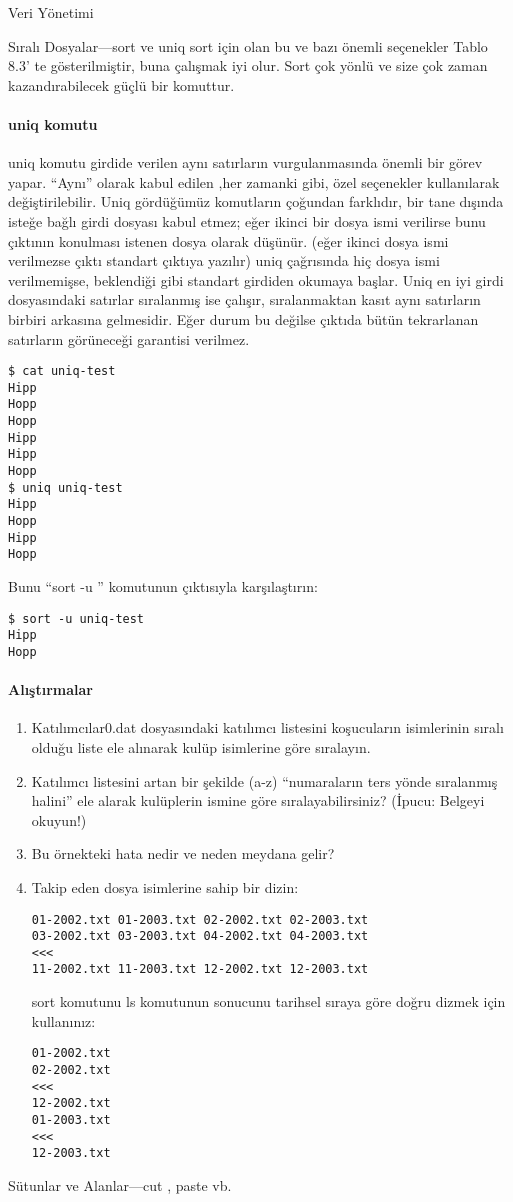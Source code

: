 \begin{section}{Veri Yönetimi}
\begin{subsection}{Sıralı Dosyalar—sort ve uniq}
sort için olan bu ve bazı önemli seçenekler Tablo 8.3' te gösterilmiştir, buna çalışmak iyi olur. Sort çok yönlü ve size çok zaman kazandırabilecek güçlü bir komuttur.
\paragraph{uniq komutu}{uniq komutu girdide verilen aynı satırların vurgulanmasında önemli bir görev yapar.  “Aynı” olarak kabul edilen ,her zamanki gibi, özel seçenekler kullanılarak değiştirilebilir. Uniq gördüğümüz komutların çoğundan farklıdır, bir tane dışında isteğe bağlı girdi dosyası kabul etmez; eğer ikinci bir dosya ismi verilirse bunu çıktının konulması istenen dosya olarak düşünür. (eğer ikinci dosya ismi verilmezse çıktı standart çıktıya yazılır) uniq çağrısında hiç dosya ismi verilmemişse, beklendiği gibi standart girdiden okumaya başlar. Uniq en iyi girdi dosyasındaki satırlar sıralanmış ise çalışır, sıralanmaktan kasıt aynı satırların birbiri arkasına gelmesidir. Eğer durum bu değilse çıktıda bütün tekrarlanan satırların görüneceği garantisi verilmez.}
\begin{verbatim}
$ cat uniq-test
Hipp
Hopp
Hopp
Hipp
Hipp
Hopp
$ uniq uniq-test
Hipp
Hopp
Hipp
Hopp
\end{verbatim}

Bunu “sort -u ” komutunun çıktısıyla karşılaştırın:
\begin{verbatim}
$ sort -u uniq-test
Hipp
Hopp
\end{verbatim}

\paragraph{{\Huge{\PencilLeftDown}}Alıştırmalar}{
\begin{enumerate}
 \item Katılımcılar0.dat dosyasındaki katılımcı listesini koşucuların isimlerinin sıralı olduğu liste ele alınarak kulüp isimlerine göre sıralayın.
 \item Katılımcı listesini artan bir şekilde (a-z) “numaraların ters yönde sıralanmış halini” ele alarak kulüplerin ismine göre sıralayabilirsiniz? (İpucu: Belgeyi okuyun!)
 \item Bu örnekteki hata nedir ve neden meydana gelir?
 \item Takip eden dosya isimlerine sahip bir dizin: 
 \begin{verbatim}
01-2002.txt 01-2003.txt 02-2002.txt 02-2003.txt
03-2002.txt 03-2003.txt 04-2002.txt 04-2003.txt
<<<
11-2002.txt 11-2003.txt 12-2002.txt 12-2003.txt
 \end{verbatim}
 sort komutunu ls komutunun sonucunu tarihsel sıraya göre doğru dizmek için kullanınız:
 \begin{verbatim}
01-2002.txt
02-2002.txt
<<<
12-2002.txt
01-2003.txt
<<<
12-2003.txt
 \end{verbatim}
\end{enumerate}}
\end{subsection}
\begin{subsection}{Sütunlar ve Alanlar—cut , paste vb.}


\end{subsection}
\end{section}
